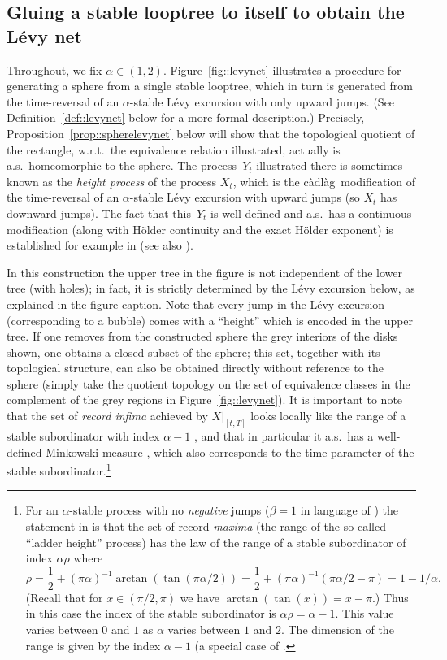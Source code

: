 \documentclass[10pt]{amsart}
\theoremstyle{plain}
\numberwithin{theorem}{section}
\theoremstyle{definition}
\newcommand{\cadlag}{càdlàg}
\begin{document}
\subsection{Gluing a stable looptree to itself to obtain the Lévy net}
\label{subsec::spheresassymetricholes}

Throughout, we fix $\alpha \in (1,2)$. Figure~\ref{fig::levynet} illustrates a procedure for generating a sphere from a single stable looptree, which in turn is generated from the time-reversal of an $\alpha$-stable Lévy excursion with only upward jumps. (See Definition~\ref{def::levynet} below for a more formal description.) Precisely, Proposition~\ref{prop::spherelevynet} below will show that the topological quotient of the rectangle, w.r.t.\ the equivalence relation illustrated, actually is a.s.\ homeomorphic to the sphere. The process~$Y_t$ illustrated there is sometimes known as the \emph{height process} of the process $X_t$, which is the \cadlag\ modification of the time-reversal of an $\alpha$-stable Lévy excursion with upward jumps (so $X_t$ has downward jumps). The fact that this~$Y_t$ is well-defined and a.s.\ has a continuous modification (along with Hölder continuity and the exact Hölder exponent) is established for example in \cite[Ths.\,1.4.3 and~1.4.4]{duquesnelegall2005levytrees} (see also \cite{legalllejan1998levytrees}).

In this construction the upper tree in the figure is not independent of the lower tree (with holes); in fact, it is strictly determined by the Lévy excursion below, as explained in the figure caption. Note that every jump in the Lévy excursion (corresponding to a bubble) comes with a ``height'' which is encoded in the upper tree. If one removes from the constructed sphere the grey interiors of the disks shown, one obtains a closed subset of the sphere; this set, together with its topological structure, can also be obtained directly without reference to the sphere (simply take the quotient topology on the set of equivalence classes in the complement of the grey regions in Figure~\ref{fig::levynet}). It is important to note that the set of \emph{record infima} achieved by $X|_{[t,T]}$ looks locally like the range of a stable subordinator with index $\alpha - 1$ \cite[Chap.\,VIII, Lem.\,1]{bertoinlevybook}, and that in particular it a.s.\ has a well-defined Minkowski measure \cite{ft1983local}, which also corresponds to the time parameter of the stable subordinator.\footnote{For an $\alpha$-stable process with no \emph{negative} jumps ($\beta = 1$ in language of \cite{bertoinlevybook}) the statement in \cite[Chap.\,VIII, Lem.\,1]{bertoinlevybook} is that the set of record \emph{maxima} (the range of the so-called ``ladder height'' process) has the law of the range of a stable subordinator of index $\alpha \rho$ where
\[
\rho = \frac12 + (\pi \alpha)^{-1} \arctan (\tan (\pi \alpha/2)) = \frac12 + (\pi\alpha)^{-1} (\pi \alpha/2-\pi) = 1-1/\alpha.
\]
(Recall that for $x \in (\pi/2, \pi)$ we have $\arctan (\tan (x)) = x - \pi$.) Thus in this case the index of the stable subordinator is $\alpha \rho = \alpha - 1 $. This value varies between $0$ and $1$ as $\alpha$ varies between $1$ and $2$. The dimension of the range is given by the index $\alpha - 1$ (a special case of \cite[Chap.\,III, Th.\,15]{bertoinlevybook}.}
\end{document}

